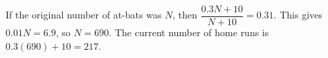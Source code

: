 If the original number of at-bats was $N$, then $\dfrac{0.3N+10}{N+10}=0.31$. This gives $0.01N=6.9$, so $N=690$. The current number of home runs is $0.3(690)+10=\boxed{217}$.
